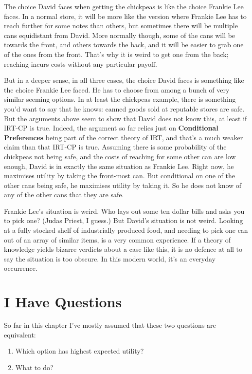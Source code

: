\documentclass[
  11pt,
]{book}
\providecommand{\tightlist}{%
  \setlength{\itemsep}{0pt}\setlength{\parskip}{0pt}}
\begin{document}
The choice David faces when getting the chickpeas is like the choice Frankie Lee faces. In a normal store, it will be more like the version where Frankie Lee has to reach further for some notes than others, but sometimes there will be multiple cans equidistant from David. More normally though, some of the cans will be towards the front, and others towards the back, and it will be easier to grab one of the ones from the front. That's why it is weird to get one from the back; reaching incurs costs without any particular payoff.

But in a deeper sense, in all three cases, the choice David faces is something like the choice Frankie Lee faced. He has to choose from among a bunch of very similar seeming options. In at least the chickpeas example, there is something you'd want to say that he knows: canned goods sold at reputable stores are safe. But the arguments above seem to show that David does not know this, at least if IRT-CP is true. Indeed, the argument so far relies just on \textbf{Conditional Preferences} being part of the correct theory of IRT, and that's a much weaker claim than that IRT-CP is true. Assuming there is some probability of the chickpeas not being safe, and the costs of reaching for some other can are low enough, David is in exactly the same situation as Frankie Lee. Right now, he maximises utility by taking the front-most can. But conditional on one of the other cans being safe, he maximises utility by taking it. So he does not know of any of the other cans that they are safe.

Frankie Lee's situation is weird. Who lays out some ten dollar bills and asks you to pick one? (Judas Priest, I guess.) But David's situation is not weird. Looking at a fully stocked shelf of industrially produced food, and needing to pick one can out of an array of similar items, is a very common experience. If a theory of knowledge yields bizarre verdicts about a case like this, it is no defence at all to say the situation is too obscure. In this modern world, it's an everyday occurrence.

\hypertarget{supermarketquestions}{%
\section{I Have Questions}\label{supermarketquestions}}

So far in this chapter I've mostly assumed that these two questions are equivalent:

\begin{enumerate}
\def\labelenumi{\arabic{enumi}.}
\tightlist
\item
  Which option has highest expected utility?
\item
  What to do?
\end{enumerate}
\end{document}

